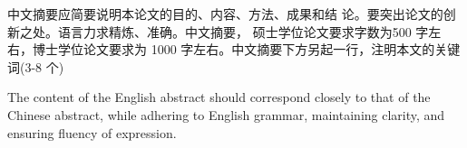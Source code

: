 \begin{cabstract}
中文摘要应简要说明本论文的目的、内容、方法、成果和结
论。要突出论文的创新之处。语言力求精炼、准确。中文摘要，
硕士学位论文要求字数为500 字左右，博士学位论文要求为
1000 字左右。中文摘要下方另起一行，注明本文的关键词(3-8
个)

\end{cabstract}

\begin{eabstract}

The content of the English abstract should correspond closely to that of the Chinese abstract, while adhering to English grammar, maintaining clarity, and ensuring fluency of expression.
\end{eabstract}


